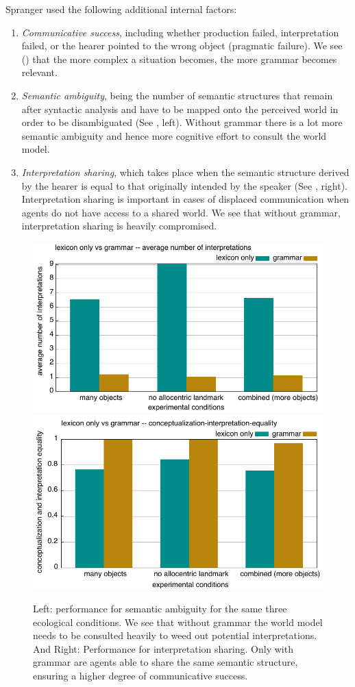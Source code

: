 Spranger used the following additional internal factors: 
\begin{enumerate}
\item {\itshape Communicative success}, including whether production failed, interpretation failed, or the hearer pointed to the wrong 
object (pragmatic failure). We see () that the more complex a situation becomes, the 
more grammar becomes relevant. 
\item {\itshape Semantic ambiguity}, being the number of semantic structures that remain after syntactic analysis and have to be mapped 
onto the perceived world in order to be disambiguated (See , left). Without grammar there is a lot 
more semantic ambiguity and hence more cognitive effort to consult the world model. 
\item {\itshape Interpretation sharing}, which takes place when the semantic structure derived by the hearer is equal to that originally 
intended by the speaker (See , right). Interpretation sharing is important in cases of displaced 
communication when agents do not have access to a shared world. We see that without grammar, interpretation sharing is 
heavily compromised. 
\end{enumerate}


\begin{figure}
\centerline{\includegraphics[width=0.5\linewidth]{chap12/figs/why-grammar-german-avg-interpretations.pdf}
\includegraphics[width=0.5\linewidth]{chap12/figs/why-grammar-conceptualization-interpretation-equality.pdf}}
\caption{Left: performance for semantic ambiguity for the same three ecological conditions. We see that without grammar
the world model needs to be consulted heavily to weed out potential interpretations. And Right: Performance for interpretation sharing.
Only with grammar are agents able to share the same semantic structure, ensuring a higher degree of communicative success.}
\label{fig:ambiguity}
\end{figure}

